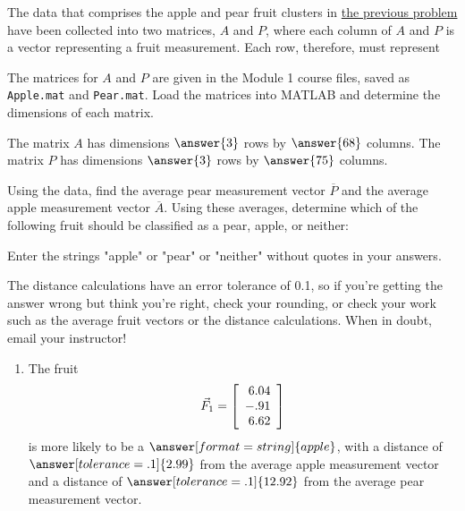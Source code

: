 \documentclass{ximera}
\author{Zack Reed}
\begin{document}
\begin{problem}

The data that comprises the apple and pear fruit clusters in \href{https://ximera.osu.edu/appliedlinearalgebra/c1ChapterOne/Exercises/c1Homework/apple_pear_vect}{the previous problem} have been collected into two matrices, $A$ and $P$, where each column of $A$ and $P$ is a vector representing a fruit measurement. Each row, therefore, must represent

\begin{multipleChoice}
\end{multipleChoice}

The matrices for $A$ and $P$ are given in the Module 1 course files, saved as \texttt{Apple.mat} and \texttt{Pear.mat}. Load the matrices into MATLAB and determine the dimensions of each matrix.

The matrix $A$ has dimensions $\answer{3}$ rows by $\answer{68}$ columns. The matrix $P$ has dimensions $\answer{3}$ rows by $\answer{75}$ columns.

Using the data, find the average pear measurement vector $\overline{P}$ and the average apple measurement vector $\overline{A}$. Using these averages, determine which of the following fruit should be classified as a pear, apple, or neither:

\begin{hint}
  Enter the strings "apple" or "pear" or "neither" without quotes in your answers.
  
  The distance calculations have an error tolerance of 0.1, so if you're getting the answer wrong but think you're right, check your rounding, or check your work such as the average fruit vectors or the distance calculations. When in doubt, email your instructor!
\end{hint}

\begin{enumerate}
\item
The fruit
\begin{equation*}
  \vec{F}_1=\startmat{r}
    6.04 \\
    -.91 \\
    6.62
  \stopmat
\end{equation*}
is more likely to be a $\answer[format=string]{apple}$, with a distance of $\answer[tolerance=.1]{2.99}$ from the average apple measurement vector and a distance of $\answer[tolerance=.1]{12.92}$ from the average pear measurement vector.


\end{enumerate}
\end{problem}
\end{document}
